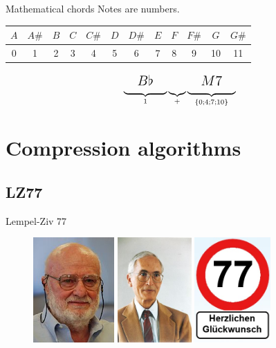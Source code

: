 \documentclass[10pt]{beamer}
\begin{document}
\begin{frame}{Mathematical chords}
Notes are numbers. \bigskip \pause

\begin{tabular}{|c|c|c|c|c|c|c|c|c|c|c|c|}
\hline
$A$&$A\#$&$B$&$C$&$C\#$&$D$&$D\#$&$E$&$F$&$F\#$&$G$&$G\#$ \\ \hline
0&1&2&3&4&5&6&7&8&9&10&11 \\ \hline
\end{tabular} \bigskip \pause

\begin{equation*}
\Large
\underbrace{\strut~~~B\flat~~~}_{1}
\underbrace{\strut}_{+}
\underbrace{\strut~~~M7~~~}_{\{0;4;7;10\}}
\end{equation*}
\end{frame}

\section{Compression algorithms}

\subsection{LZ77}

\begin{frame}{Lempel-Ziv 77}
\begin{figure}
\centering
\includegraphics[height = 4cm]{images/lempel.jpg} \hspace{0.5cm}
\includegraphics[height = 4cm]{images/ziv.jpg} \hspace{0.5cm}
\includegraphics[height = 4cm]{images/77.jpg}
\end{figure}
\end{frame}
\end{document}
